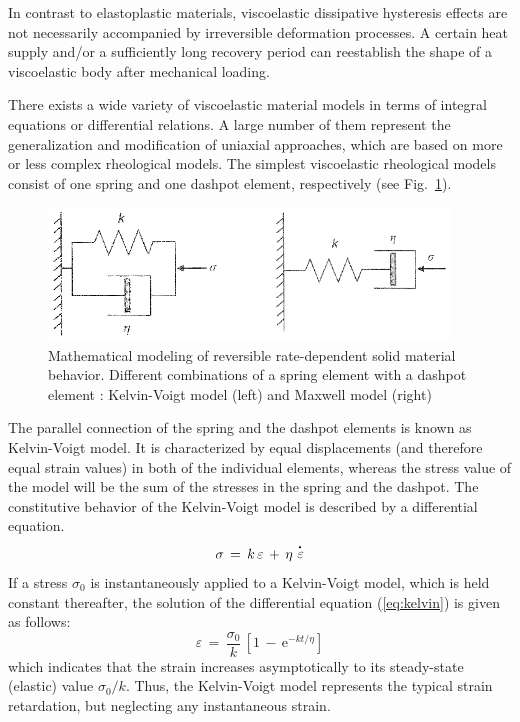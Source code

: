 In contrast to elastoplastic materials, viscoelastic dissipative hysteresis effects are not necessarily accompanied by irreversible
deformation processes. A certain heat supply and/or a sufficiently long recovery period can reestablish the shape of a viscoelastic body
after mechanical loading.

There exists a wide variety of viscoelastic material models in terms of integral equations or differential relations. A large number of
them represent the generalization and modification of uniaxial approaches, which are based on more or less complex rheological models. The
simplest viscoelastic rheological models consist of one spring and one dashpot element, respectively (see Fig.~\ref{fig:rheomod_vel}).
\begin{figure}[htb!]
\begin{center}
\footnotesize
\includegraphics[width=0.95\textwidth]{figures/rheomod_vel.eps}
\caption{Mathematical modeling of reversible rate-dependent solid material behavior. Different combinations of a spring element with a
dashpot element \cite{JCZ:2007}: Kelvin-Voigt model (left) and Maxwell model (right)}
\label{fig:rheomod_vel}
\end{center}
\end{figure}

\newpage

The parallel connection of the spring and the dashpot elements is known as Kelvin-Voigt model. It is characterized by equal displacements
(and therefore equal strain values) in both of the individual elements, whereas the stress value of the model will be the sum of the
stresses in the spring and the dashpot. The constitutive behavior of the Kelvin-Voigt model is described by a differential equation.
\begin{equation}
\sigma\,=\,k\,\varepsilon\,+\,\eta\,\mathop{\varepsilon}\limits^{\miu{.}{}{}}
\label{eq:kelvin}
\end{equation}
If a stress $\sigma_0$ is instantaneously applied to a Kelvin-Voigt model, which is held constant thereafter, the solution of the
differential equation (\ref{eq:kelvin}) is given as follows:
\begin{equation}
\varepsilon\,=\,\frac{\sigma_0}{k}\,\left[1\,-\,\mathrm{e}^{-kt/\eta}\right]
\end{equation}
which indicates that the strain increases asymptotically to its steady-state (elastic) value $\sigma_0/k$. Thus, the Kelvin-Voigt model
represents the typical strain retardation, but neglecting any instantaneous strain.

